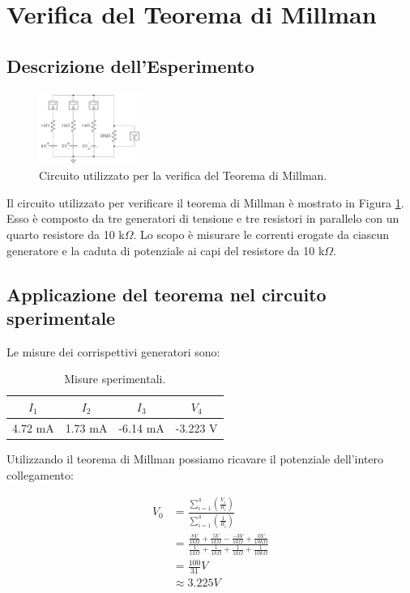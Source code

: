 \documentclass[a4paper,6pt]{article}
\begin{document}
\section{Verifica del Teorema di Millman}


\subsection{Descrizione dell'Esperimento}

\begin{figure}[h!]
    \centering
    \includegraphics[width=0.3\textwidth]{assets/2.png}
    \caption{Circuito utilizzato per la verifica del Teorema di Millman.}
    \label{fig:millman}
\end{figure}

Il circuito utilizzato per verificare il teorema di Millman è mostrato in Figura \ref{fig:millman}. Esso è composto da tre generatori di tensione e tre resistori in parallelo con un quarto resistore da 10 k\(\Omega\). Lo scopo è misurare le correnti erogate da ciascun generatore e la caduta di potenziale ai capi del resistore da 10 k\(\Omega\).


\subsection{Applicazione del teorema nel circuito sperimentale}

Le misure dei corrispettivi generatori sono:

\begin{table}[h!]
    \centering
    \begin{tabular}{|c|c|c|c|}
        \hline
        \(I_1\) & \(I_2\) & \(I_3\) & \(V_4\) \\ \hline
        4.72 mA   & 1.73 mA    & -6.14 mA  & -3.223 V   \\ \hline
    \end{tabular}
    \caption{Misure sperimentali.}
    \label{tab:esempio}
\end{table}

Utilizzando il teorema di Millman possiamo ricavare il potenziale dell'intero collegamento:

\[
\begin{aligned}
    V_0
    &= \frac{\sum_{i=1}^{4} \left( \frac{V_i}{R_i}\right)}{\sum_{i=1}^{4} \left(\frac{1}{R_i}\right)} \\
    &= \frac{\frac{8V}{1 k \Omega} + \frac{5V}{1 k \Omega} - \frac{- 3V}{1 k \Omega} + \frac{0V}{10 k \Omega}}{\frac{1}{1 k \Omega} + \frac{1}{1 k \Omega} + \frac{1}{1 k \Omega}+ \frac{1}{10 k\Omega}} \\
    & = \frac{100}{31} V \\
    & \approx 3.225 V
\end{aligned}
\]
\end{document}
